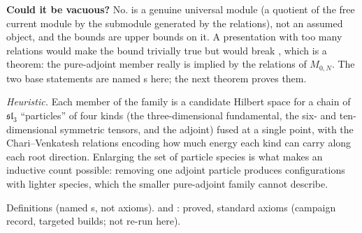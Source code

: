 \begin{dictionary}
\textbf{Could it be vacuous?} No.  is a genuine universal module (a quotient of the free current module by the
submodule generated by the relations), not an assumed object, and the bounds are upper bounds on it. A presentation with too
many relations would make the bound trivially true but would break , which is a theorem: the pure-adjoint
member really is implied by the relations of $M_{0,N}$. The two base statements are named s here; the next theorem
proves them.
\end{dictionary}

\begin{physics}
\emph{Heuristic.} Each member of the family is a candidate Hilbert space for a chain of $\mathfrak{sl}_3$ ``particles'' of four
kinds (the three-dimensional fundamental, the six- and ten-dimensional symmetric tensors, and the adjoint) fused at a single
point, with the Chari--Venkatesh relations encoding how much energy each kind can carry along each root direction. Enlarging the
set of particle species is what makes an inductive count possible: removing one adjoint particle produces configurations with
lighter species, which the smaller pure-adjoint family cannot describe.
\end{physics}

\begin{status}
Definitions (named s, not axioms).  and : proved, standard axioms
(campaign record, targeted builds; not re-run here).
\end{status}

